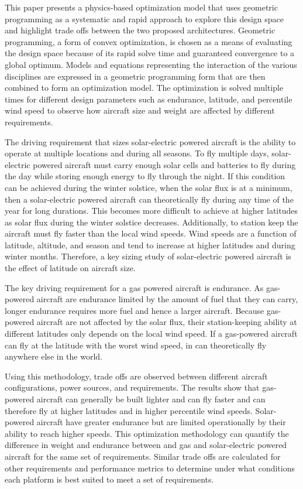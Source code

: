 This paper presents a physics-based optimization model that uses geometric programming as a systematic and rapid approach to explore this design space and highlight trade offs between the two proposed architectures.
Geometric programming, a form of convex optimization, is chosen as a means of evaluating the design space because of its rapid solve time and guaranteed convergence to a global optimum.\cite{gp}
Models and equations representing the interaction of the various disciplines are expressed in a geometric programming form that are then combined to form an optimization model. 
The optimization is solved multiple times for different design parameters such as endurance, latitude, and percentile wind speed to observe how aircraft size and weight are affected by different requirements. 

The driving requirement that sizes solar-electric powered aircraft is the ability to operate at multiple locations and during all seasons.  
To fly multiple days, solar-electric powered aircraft must carry enough solar cells and batteries to fly during the day while storing enough energy to fly through the night.\cite{solartech}
If this condition can be achieved during the winter solstice, when the solar flux is at a minimum, then a solar-electric powered aircraft can theoretically fly during any time of the year for long durations. \cite{solartech}
This becomes more difficult to achieve at higher latitudes as solar flux during the winter solstice decreases.  
Additionally, to station keep the aircraft must fly faster than the local wind speeds.  
Wind speeds are a function of latitude, altitude, and season and tend to increase at higher latitudes and during winter months. 
Therefore, a key sizing study of solar-electric powered aircraft is the effect of latitude on aircraft size.  

The key driving requirement for a gas powered aircraft is endurance.  
As gas-powered aircraft are endurance limited by the amount of fuel that they can carry, longer endurance requires more fuel and hence a larger aircraft.  
Because gas-powered aircraft are not affected by the solar flux, their station-keeping ability at different latitudes only depends on the local wind speed. 
If a gas-powered aircraft can fly at the latitude with the worst wind speed, in can theoretically fly anywhere else in the world.  

Using this methodology, trade offs are observed between different aircraft configurations, power sources, and requirements.  
The results show that gas-powered aircraft can generally be built lighter and can fly faster and can therefore fly at higher latitudes and in higher percentile wind speeds.  
Solar-powered aircraft have greater endurance but are limited operationally by their ability to reach higher speeds.  
This optimization methodology can quantify the difference in weight and endurance between and gas and solar-electric powered aircraft for the same set of requirements. 
Similar trade offs are calculated for other requirements and performance metrics to determine under what conditions each platform is best suited to meet a set of requirements.

